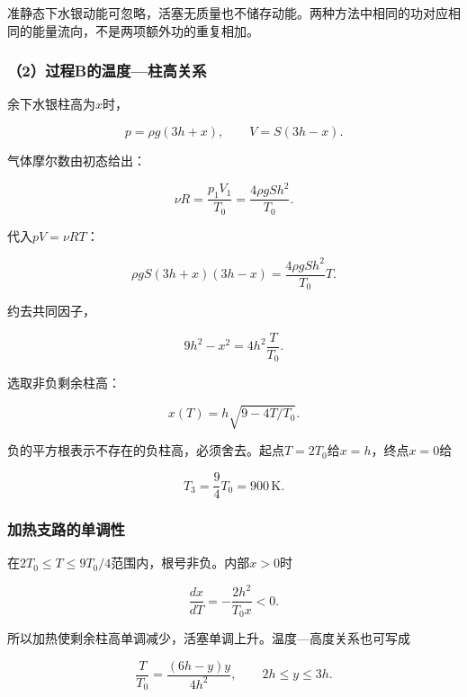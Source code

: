 \documentclass[12pt,a4paper,fontset=fandol]{ctexart}
\begin{document}
准静态下水银动能可忽略，活塞无质量也不储存动能。两种方法中相同的功对应相同的能量流向，不是两项额外功的重复相加。

\subsubsection{（2）过程B的温度---柱高关系}\label{ux8fc7ux7a0bbux7684ux6e29ux5ea6ux67f1ux9ad8ux5173ux7cfb}

余下水银柱高为\(x\)时，

\[
p=\rho g(3h+x),\qquad
V=S(3h-x).
\]

气体摩尔数由初态给出：

\[
\nu R=\frac{p_1V_1}{T_0}
=\frac{4\rho gSh^2}{T_0}.
\]

代入\(pV=\nu RT\)：

\[
\rho gS(3h+x)(3h-x)
=\frac{4\rho gSh^2}{T_0}T.
\]

约去共同因子，

\[
9h^2-x^2=4h^2\frac T{T_0}.
\]

选取非负剩余柱高：

\[
\boxed{x(T)=h\sqrt{9-4T/T_0}}.
\]

负的平方根表示不存在的负柱高，必须舍去。起点\(T=2T_0\)给\(x=h\)，终点\(x=0\)给

\[
\boxed{T_3=\frac94T_0=900\,\mathrm K}.
\]

\subsubsection{加热支路的单调性}\label{ux52a0ux70edux652fux8defux7684ux5355ux8c03ux6027}

在\(2T_0\leq T\leq9T_0/4\)范围内，根号非负。内部\(x>0\)时

\[
\frac{dx}{dT}=-\frac{2h^2}{T_0x}<0.
\]

所以加热使剩余柱高单调减少，活塞单调上升。温度---高度关系也可写成

\[
\frac T{T_0}
=\frac{(6h-y)y}{4h^2},
\qquad 2h\leq y\leq3h.
\]

\begin{center}
\begin{minipage}{\linewidth}
\centering\begingroup{}
\ifdim\wd\diagrambox>.88\linewidth
\sbox{\diagrambox}{\resizebox{.88\linewidth}{!}{\usebox{\diagrambox}}}\fi
\ifdim\ht\diagrambox>.38\textheight
\resizebox{!}{.38\textheight}{\usebox{\diagrambox}}
\else\usebox{\diagrambox}\fi
\par{}\endgroup\end{minipage}\end{center}
\end{document}

